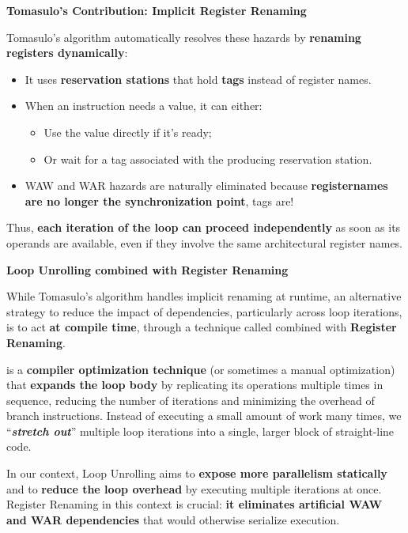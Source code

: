 \highspace
\begin{flushleft}
    \textcolor{Green3}{ \textbf{Tomasulo's Contribution: Implicit Register Renaming}}
\end{flushleft}
Tomasulo's algorithm automatically resolves these hazards by \textbf{renaming registers dynamically}:
\begin{itemize}
    \item It uses \textbf{reservation stations} that hold \textbf{tags} instead of register names.
    \item When an instruction needs a value, it can either:
    \begin{itemize}
        \item Use the value directly if it's ready;
        \item Or wait for a tag associated with the producing reservation station.
    \end{itemize}
    \item WAW and WAR hazards are naturally eliminated because \textbf{register\break names are no longer the synchronization point}, tags are!
\end{itemize}
Thus, \textbf{each iteration of the loop can proceed independently} as soon as its operands are available, even if they involve the same architectural register names.

\highspace
\begin{flushleft}
    \textcolor{Green3}{\faIcon{\speedIcon} \textbf{Loop Unrolling combined with Register Renaming}}
\end{flushleft}
While Tomasulo's algorithm handles implicit renaming at runtime, an alternative strategy to reduce the impact of dependencies, particularly across loop iterations, is to act \textbf{at compile time}, through a technique called  combined with \textbf{Register Renaming}.

\highspace
{} is a \textbf{compiler optimization technique} (or sometimes a manual optimization) that \textbf{expands the loop body} by replicating its operations multiple times in sequence, reducing the number of iterations and minimizing the overhead of branch instructions. Instead of executing a small amount of work many times, we ``\textbf{\emph{stretch out}}'' multiple loop iterations into a single, larger block of straight-line code.

\highspace
In our context, Loop Unrolling aims to \textbf{expose more parallelism statically} and to \textbf{reduce the loop overhead} by executing multiple iterations at once. Register Renaming in this context is crucial: \textbf{it eliminates artificial WAW and WAR dependencies} that would otherwise serialize execution.

